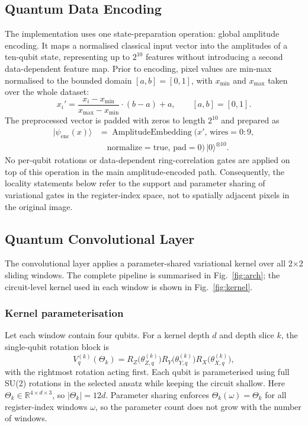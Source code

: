 \documentclass[conference]{IEEEtran}
\begin{document}
\subsection{Quantum Data Encoding}
\label{sec:encoding}
The implementation uses one state-preparation operation: global amplitude encoding. It maps a normalised classical input vector into the amplitudes of a ten-qubit state, representing up to $2^{10}$ features without introducing a second data-dependent feature map. Prior to encoding, pixel values are min-max normalised to the bounded domain $[a, b] = [0, 1]$, with $x_{\min}$ and $x_{\max}$ taken over the whole dataset:
\begin{equation}
x_i' = \frac{x_i - x_{\min}}{x_{\max} - x_{\min}} \cdot (b - a) + a, \qquad [a, b] = [0, 1].
\end{equation}
The preprocessed vector is padded with zeros to length $2^{10}$ and prepared as
\begin{equation}
\begin{aligned}
|\psi_{\mathrm{enc}}(x)\rangle
 &= \operatorname{AmplitudeEmbedding}(x',\,\mathrm{wires}=0{:}9,\\
 &\quad \mathrm{normalize}=\mathrm{true},\,\mathrm{pad}=0)\,|0\rangle^{\otimes 10}.
\end{aligned}
\end{equation}
No per-qubit rotations or data-dependent ring-correlation gates are applied on top of this operation in the main amplitude-encoded path. Consequently, the locality statements below refer to the support and parameter sharing of variational gates in the register-index space, not to spatially adjacent pixels in the original image.

\subsection{Quantum Convolutional Layer}
The convolutional layer applies a parameter-shared variational kernel over all 2$\times$2 sliding windows. The complete pipeline is summarised in Fig.~\ref{fig:arch}; the circuit-level kernel used in each window is shown in Fig.~\ref{fig:kernel}.

\subsubsection{Kernel parameterisation}
Let each window contain four qubits. For a kernel depth $d$ and depth slice $k$, the single-qubit rotation block is
\begin{equation}
V_q^{(k)}(\Theta_k) = R_Z\!\big(\theta_{Z,q}^{(k)}\big) R_Y\!\big(\theta_{Y,q}^{(k)}\big) R_X\!\big(\theta_{X,q}^{(k)}\big),
\end{equation}
with the rightmost rotation acting first.
Each qubit is parameterised using full SU(2) rotations in the selected ansatz while keeping the circuit shallow. Here $\Theta_k \in \mathbb{R}^{4 \times d \times 3}$, so $|\Theta_k| = 12d$. Parameter sharing enforces $\Theta_k(\omega) = \Theta_k$ for all register-index windows $\omega$, so the parameter count does not grow with the number of windows. 
\end{document}
